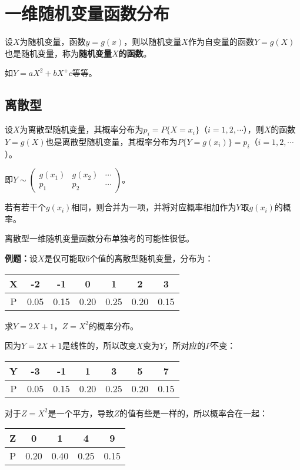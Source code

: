 \documentclass[UTF8, 12pt]{ctexart}
\begin{document}
\section{一维随机变量函数分布}

设$X$为随机变量，函数$y=g(x)$，则以随机变量$X$作为自变量的函数$Y=g(X)$也是随机变量，称为\textbf{随机变量$X$的函数}。

如$Y=aX^2+bX^+c$等等。

\subsection{离散型}

设$X$为离散型随机变量，其概率分布为$p_i=P\{X=x_i\}$（$i=1,2,\cdots$），则$X$的函数$Y=g(X)$也是离散型随机变量，其概率分布为$P\{Y=g(x_i)\}=p_i$（$i=1,2,\cdots$）。

即$Y\sim\left(\begin{array}{ccc}
    g(x_1) & g(x_2) & \cdots \\
    p_1 & p_2 & \cdots
\end{array}\right)$。

若有若干个$g(x_i)$相同，则合并为一项，并将对应概率相加作为$Y$取$g(x_i)$的概率。

离散型一维随机变量函数分布单独考的可能性很低。

\textbf{例题：}设$X$是仅可能取6个值的离散型随机变量，分布为：\medskip

\begin{tabular}{c|cccccc}
    \hline
    X & -2 & -1 & 0 & 1 & 2 & 3 \\ \hline
    P & 0.05 & 0.15 & 0.20 & 0.25 & 0.20 & 0.15 \\
    \hline
\end{tabular} \medskip

求$Y=2X+1$，$Z=X^2$的概率分布。

因为$Y=2X+1$是线性的，所以改变$X$变为$Y$，所对应的$P$不变：\medskip

\begin{tabular}{c|cccccc}
    \hline
    Y & -3 & -1 & 1 & 3 & 5 & 7 \\ \hline
    P & 0.05 & 0.15 & 0.20 & 0.25 & 0.20 & 0.15 \\
    \hline
\end{tabular} \medskip

对于$Z=X^2$是一个平方，导致$Z$的值有些是一样的，所以概率合在一起：\medskip

\begin{tabular}{c|cccc}
    \hline
    Z & 0 & 1 & 4 & 9 \\ \hline
    P & 0.20 & 0.40 & 0.25 & 0.15 \\
    \hline
\end{tabular}
\end{document}
